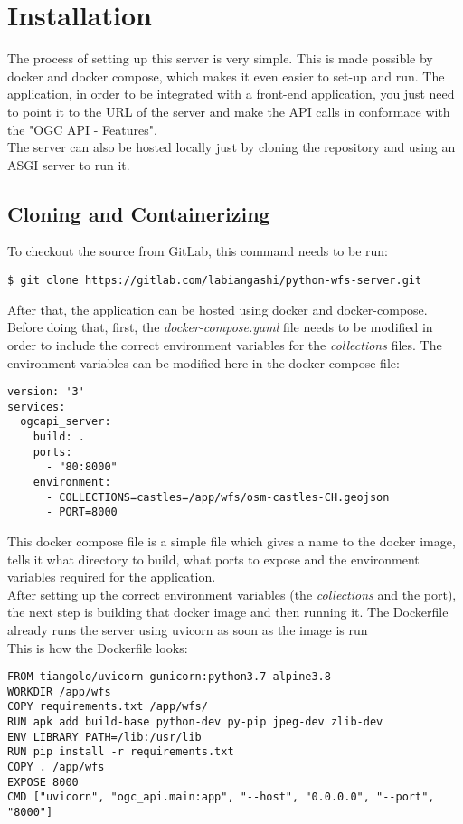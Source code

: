 \chapter{Installation}
The process of setting up this server is very simple. This is made possible by docker and docker compose, which makes it even easier to set-up and run. The application, in order to be integrated with a front-end application, you just need to point it to the URL of the server and make the API calls in conformace with the "OGC API - Features". \\
The server can also be hosted locally just by cloning the repository and using an ASGI server to run it.\\
\section{Cloning and Containerizing}
To checkout the source from GitLab, this command needs to be run:
\begin{verbatim}
$ git clone https://gitlab.com/labiangashi/python-wfs-server.git
\end{verbatim}
After that, the application can be hosted using docker and docker-compose. Before doing that, first, the \textit{docker-compose.yaml} file needs to be modified in order to include the correct environment variables for the \textit{collections} files. The environment variables can be modified here in the docker compose file: 
\begin{verbatim}
version: '3'
services:
  ogcapi_server:
    build: .
    ports:
      - "80:8000"
    environment:
      - COLLECTIONS=castles=/app/wfs/osm-castles-CH.geojson
      - PORT=8000
\end{verbatim}
This docker compose file is a simple file which gives a name to the docker image, tells it what directory to build, what ports to expose and the environment variables required for the application.\\
\newline
After setting up the correct environment variables (the \textit{collections} and the port), the next step is building that docker image and then running it.
The Dockerfile already runs the server using uvicorn as soon as the image is run\\
This is how the Dockerfile looks:
\begin{verbatim}
FROM tiangolo/uvicorn-gunicorn:python3.7-alpine3.8
WORKDIR /app/wfs
COPY requirements.txt /app/wfs/
RUN apk add build-base python-dev py-pip jpeg-dev zlib-dev
ENV LIBRARY_PATH=/lib:/usr/lib
RUN pip install -r requirements.txt
COPY . /app/wfs
EXPOSE 8000
CMD ["uvicorn", "ogc_api.main:app", "--host", "0.0.0.0", "--port", "8000"]
\end{verbatim}
